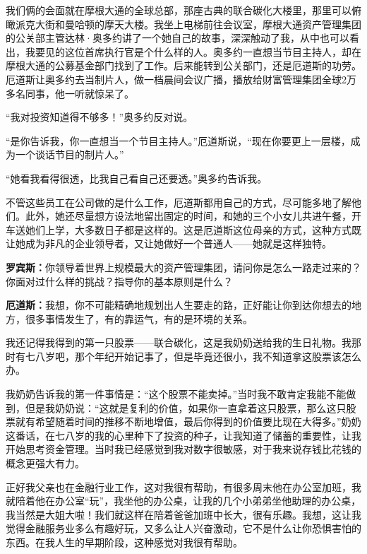 我们俩的会面就在摩根大通的全球总部，那座古典的联合碳化大楼里，那里可以俯瞰派克大街和曼哈顿的摩天大楼。我坐上电梯前往会议室，摩根大通资产管理集团的公关部主管达林·奥多约讲了一个她自己的故事，深深触动了我，从中也可以看出，我要见的这位首席执行官是个什么样的人。奥多约一直想当节目主持人，却在摩根大通的公募基金部门找到了工作。后来能转到公关部门，还是厄道斯的功劳。厄道斯让奥多约去当制片人，做一档晨间会议广播，播放给财富管理集团全球2万多名同事，他一听就惊呆了。

“我对投资知道得不够多！”奥多约反对说。

“是你告诉我，你一直想当一个节目主持人。”厄道斯说，“现在你要更上一层楼，成为一个谈话节目的制片人。”

“她看我看得很透，比我自己看自己还要透。”奥多约告诉我。

不管这些员工在公司做的是什么工作，厄道斯都用自己的方式，尽可能多地了解他们。此外，她还尽量想方设法地留出固定的时间，和她的三个小女儿共进午餐，开车送她们上学，大多数日子都是这样的。这是厄道斯这位母亲的方式，这种方式既让她成为非凡的企业领导者，又让她做好一个普通人——她就是这样独特。

\begin{BookQuote}
\textbf{罗宾斯：}你领导着世界上规模最大的资产管理集团，请问你是怎么一路走过来的？你面对过什么样的挑战？指导你的基本原则是什么？
\end{BookQuote}

\begin{BookQuote}
\textbf{厄道斯：}我想，你不可能精确地规划出人生要走的路，正好能让你到达你想去的地方，很多事情发生了，有的靠运气，有的是环境的关系。
\end{BookQuote}

我还记得我得到的第一只股票——联合碳化，这是我奶奶送给我的生日礼物。我那时有七八岁吧，那个年纪开始记事了，但是毕竟还很小，我不知道拿这股票该怎么办。

我奶奶告诉我的第一件事情是：“这个股票不能卖掉。”当时我不敢肯定我能不能做到，但是我奶奶说：“这就是复利的价值，如果你一直拿着这只股票，那么这只股票就有希望随着时间的推移不断地增值，最后你得到的价值要比现在大得多。”奶奶这番话，在七八岁的我的心里种下了投资的种子，让我知道了储蓄的重要性，让我开始思考资金管理。当时我已经感觉到我对数字很敏感，对于我来说存钱比花钱的概念更强大有力。

正好我父亲也在金融行业工作，这对我很有帮助，有很多周末他在办公室加班，我就陪着他在办公室“玩”，我坐他的办公桌，让我的几个小弟弟坐他助理的办公桌，我当然是大姐大啦！我们就这样在陪着爸爸加班中长大，很有乐趣。我想，这让我觉得金融服务业多么有趣好玩，又多么让人兴奋激动，它不是什么让你恐惧害怕的东西。在我人生的早期阶段，这种感觉对我很有帮助。

